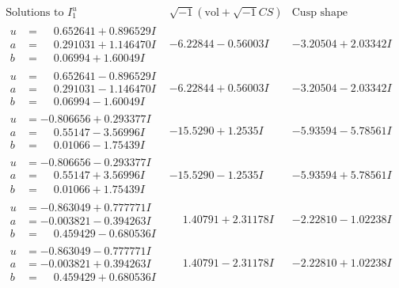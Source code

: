 \documentclass[1p]{elsarticle_modified}
\theoremstyle{definition}
\newcommand{\I}{\sqrt{-1}}
\begin{document}
$$\begin{array}{c|c|c}  
\text{Solutions to }I^u_{1}& \I (\text{vol} + \sqrt{-1}CS) & \text{Cusp shape}\\
 \hline 
\begin{aligned}
u &= \phantom{-}0.652641 + 0.896529 I \\
a &= \phantom{-}0.291031 + 1.146470 I \\
b &= \phantom{-}0.06994 + 1.60049 I\end{aligned}
 & -6.22844 - 0.56003 I & -3.20504 + 2.03342 I \\ \hline\begin{aligned}
u &= \phantom{-}0.652641 - 0.896529 I \\
a &= \phantom{-}0.291031 - 1.146470 I \\
b &= \phantom{-}0.06994 - 1.60049 I\end{aligned}
 & -6.22844 + 0.56003 I & -3.20504 - 2.03342 I \\ \hline\begin{aligned}
u &= -0.806656 + 0.293377 I \\
a &= \phantom{-}0.55147 - 3.56996 I \\
b &= \phantom{-}0.01066 - 1.75439 I\end{aligned}
 & -15.5290 + 1.2535 I & -5.93594 - 5.78561 I \\ \hline\begin{aligned}
u &= -0.806656 - 0.293377 I \\
a &= \phantom{-}0.55147 + 3.56996 I \\
b &= \phantom{-}0.01066 + 1.75439 I\end{aligned}
 & -15.5290 - 1.2535 I & -5.93594 + 5.78561 I \\ \hline\begin{aligned}
u &= -0.863049 + 0.777771 I \\
a &= -0.003821 - 0.394263 I \\
b &= \phantom{-}0.459429 - 0.680536 I\end{aligned}
 & \phantom{-}1.40791 + 2.31178 I & -2.22810 - 1.02238 I \\ \hline\begin{aligned}
u &= -0.863049 - 0.777771 I \\
a &= -0.003821 + 0.394263 I \\
b &= \phantom{-}0.459429 + 0.680536 I\end{aligned}
 & \phantom{-}1.40791 - 2.31178 I & -2.22810 + 1.02238 I \\ \hline\begin{aligned}

\end{aligned}
\end{array}$$
\end{document}
